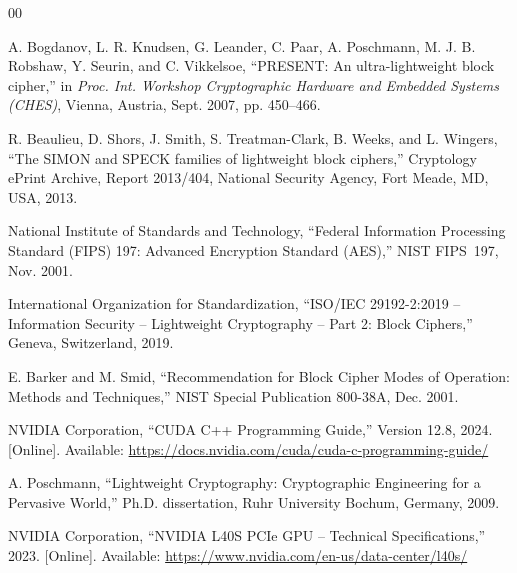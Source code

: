 \documentclass[conference]{IEEEtran}
\begin{document}
\begin{thebibliography}{00}

A. Bogdanov, L. R. Knudsen, G. Leander, C. Paar, A. Poschmann, M. J. B. Robshaw, Y. Seurin, and
C. Vikkelsoe, ``PRESENT: An ultra-lightweight block cipher,'' in \textit{Proc. Int. Workshop
Cryptographic Hardware and Embedded Systems (CHES)}, Vienna, Austria, Sept. 2007, pp. 450--466.

R. Beaulieu, D. Shors, J. Smith, S. Treatman-Clark, B. Weeks, and L. Wingers, ``The SIMON and
SPECK families of lightweight block ciphers,'' Cryptology ePrint Archive, Report 2013/404,
National Security Agency, Fort Meade, MD, USA, 2013.

National Institute of Standards and Technology, ``Federal Information Processing Standard (FIPS)
197: Advanced Encryption Standard (AES),'' NIST FIPS~197, Nov. 2001.

International Organization for Standardization, ``ISO/IEC 29192-2:2019 -- Information Security --
Lightweight Cryptography -- Part 2: Block Ciphers,'' Geneva, Switzerland, 2019.

E. Barker and M. Smid, ``Recommendation for Block Cipher Modes of Operation: Methods and
Techniques,'' NIST Special Publication 800-38A, Dec. 2001.

NVIDIA Corporation, ``CUDA C++ Programming Guide,'' Version 12.8, 2024.
[Online]. Available: \url{https://docs.nvidia.com/cuda/cuda-c-programming-guide/}

A. Poschmann, ``Lightweight Cryptography: Cryptographic Engineering for a Pervasive World,''
Ph.D. dissertation, Ruhr University Bochum, Germany, 2009.

NVIDIA Corporation, ``NVIDIA L40S PCIe GPU -- Technical Specifications,'' 2023.
[Online]. Available: \url{https://www.nvidia.com/en-us/data-center/l40s/}

\end{thebibliography}
\end{document}
